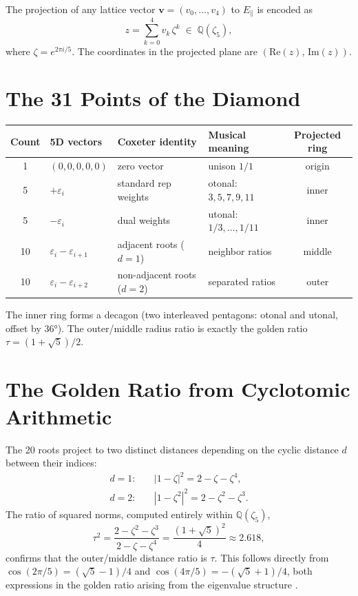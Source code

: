 \documentclass[11pt]{article}
\begin{document}
The projection of any lattice vector $\mathbf{v} = (v_0,\ldots,v_4)$ to $E_\parallel$
is encoded as
\[
  z = \sum_{k=0}^{4} v_k \,\zeta^k \;\in\; \mathbb{Q}(\zeta_5),
\]
where $\zeta = e^{2\pi i/5}$. The coordinates in the projected plane are
$(\mathrm{Re}(z),\,\mathrm{Im}(z))$.

\section{The 31 Points of the Diamond}

\begin{center}
\begin{tabular}{clllc}
  \toprule
  Count & 5D vectors & Coxeter identity & Musical meaning & Projected ring \\
  \midrule
  1  & $(0,0,0,0,0)$    & zero vector         & unison $1/1$               & origin \\
  5  & $+\varepsilon_i$ & standard rep weights & otonal: $3,5,7,9,11$       & inner \\
  5  & $-\varepsilon_i$ & dual weights        & utonal: $1/3,\ldots,1/11$  & inner \\
  10 & $\varepsilon_i - \varepsilon_{i+1}$ & adjacent roots ($d=1$) & neighbor ratios & middle \\
  10 & $\varepsilon_i - \varepsilon_{i+2}$ & non-adjacent roots ($d=2$) & separated ratios & outer \\
  \bottomrule
\end{tabular}
\end{center}

The inner ring forms a decagon (two interleaved pentagons: otonal and utonal,
offset by $36°$). The outer/middle radius ratio is exactly the golden ratio
$\tau = (1+\sqrt{5})/2$.

\section{The Golden Ratio from Cyclotomic Arithmetic}

The 20 roots project to two distinct distances depending on the cyclic distance
$d$ between their indices:
\begin{align*}
  d=1: \quad &|1 - \zeta|^2 = 2 - \zeta - \zeta^4, \\
  d=2: \quad &|1 - \zeta^2|^2 = 2 - \zeta^2 - \zeta^3.
\end{align*}
The ratio of squared norms, computed entirely within $\mathbb{Q}(\zeta_5)$,
\[
  \tau^2 = \frac{2 - \zeta^2 - \zeta^3}{2 - \zeta - \zeta^4}
         = \frac{(1+\sqrt{5})^2}{4} \approx 2.618,
\]
confirms that the outer/middle distance ratio is $\tau$. This follows directly
from $\cos(2\pi/5) = (\sqrt{5}-1)/4$ and $\cos(4\pi/5) = -(\sqrt{5}+1)/4$,
both expressions in the golden ratio arising from the eigenvalue structure
\cite{senechal1995}.
\end{document}

